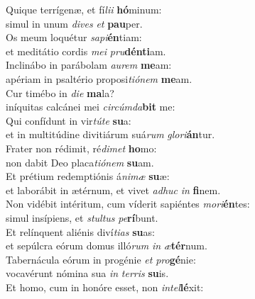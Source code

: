\evenverse Quique terrígenæ, et fí\textit{li}\textit{i} \textbf{hó}minum:~\*\\
\evenverse simul in unum \textit{di}\textit{ves} \textit{et} \textbf{pau}per.\\
\oddverse Os meum loquétur \textit{sa}\textit{pi}\textbf{én}tiam:~\*\\
\oddverse et meditátio cordis \textit{me}\textit{i} \textit{pru}\textbf{dén}\textbf{ti}am.\\
\evenverse Inclinábo in parábolam \textit{au}\textit{rem} \textbf{me}am:~\*\\
\evenverse apériam in psaltério proposi\textit{ti}\textit{ó}\textit{nem} \textbf{me}am.\\
\oddverse Cur timébo in \textit{di}\textit{e} \textbf{ma}la?~\*\\
\oddverse iníquitas calcánei mei \textit{cir}\textit{cúm}\textit{da}\textbf{bit} me:\\
\evenverse Qui confídunt in vir\textit{tú}\textit{te} \textbf{su}a:~\*\\
\evenverse et in multitúdine divitiárum suá\textit{rum} \textit{glo}\textit{ri}\textbf{án}tur.\\
\oddverse Frater non rédimit, ré\textit{di}\textit{met} \textbf{ho}mo:~\*\\
\oddverse non dabit Deo placa\textit{ti}\textit{ó}\textit{nem} \textbf{su}am.\\
\evenverse Et prétium redemptiónis á\textit{ni}\textit{mæ} \textbf{su}æ:~\*\\
\evenverse et laborábit in ætérnum, et vivet \textit{a}\textit{dhuc} \textit{in} \textbf{fi}nem.\\
\oddverse Non vidébit intéritum, cum víderit sapiéntes \textit{mo}\textit{ri}\textbf{én}tes:~\*\\
\oddverse simul insípiens, et \textit{stul}\textit{tus} \textit{pe}\textbf{rí}bunt.\\
\evenverse Et relínquent aliénis diví\textit{ti}\textit{as} \textbf{su}as:~\*\\
\evenverse et sepúlcra eórum domus illó\textit{rum} \textit{in} \textit{æ}\textbf{tér}num.\\
\oddverse Tabernácula eórum in progénie \textit{et} \textit{pro}\textbf{gé}nie:~\*\\
\oddverse vocavérunt nómina sua \textit{in} \textit{ter}\textit{ris} \textbf{su}is.\\
\evenverse Et homo, cum in honóre esset, non \textit{in}\textit{tel}\textbf{lé}xit:~\*\\
